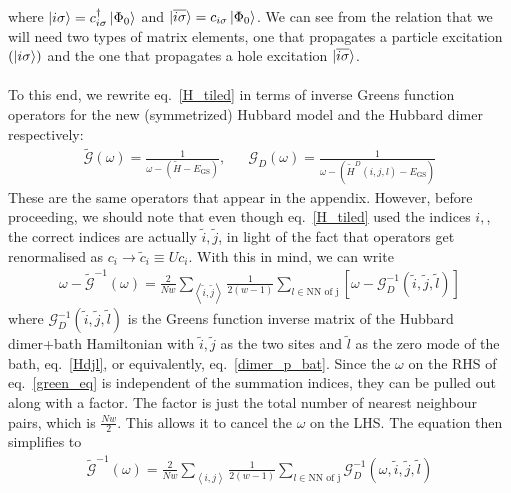 \documentclass{article}
\numberwithin{equation}{section}
\begin{document}
where $\ket{i\sigma}=c^\dagger_{i\sigma}\ket{\Phi_0}$ and $\ket{\overline{i\sigma}}=c_{i\sigma}\ket{\Phi_0}$. We can see from the relation that we will need two types of matrix elements, one that propagates a particle excitation $\left( \ket{i\sigma} \right) $ and the one that propagates a hole excitation $\ket{\overline{i\sigma}}$.
\\\\
To this end, we rewrite eq.~\ref{H_tiled} in terms of inverse Greens function operators for the new (symmetrized) Hubbard model and the Hubbard dimer respectively:
\begin{equation}\begin{aligned}
	\label{Gd_op}
	\mathcal{\tilde G}(\omega) = \frac{1}{\omega - \left(\tilde H - E_\text{GS}\right)}, && \mathcal{G}_D(\omega) = \frac{1}{\omega - \left(\tilde H^D(i,j,l) - E_\text{GS}\right)}
\end{aligned}\end{equation}
These are the same operators that appear in the appendix. However, before proceeding, we should note that even though eq.~\ref{H_tiled} used the indices $i,$, the correct indices are actually $\tilde i, \tilde j$, in light of the fact that operators get renormalised as $c_i \to \tilde c_i\equiv Uc_i$. With this in mind, we can write
\begin{equation}\begin{aligned}
	\label{green_eq}
	\omega - \mathcal{\tilde G}^{-1}(\omega) = \frac{2}{Nw}\sum_{\left<\tilde i, \tilde j\right>} \frac{1}{2(w-1)} \sum_{l \in \text{NN of j}}\left[\omega - \mathcal{G}_D^{-1}\left(\tilde i, \tilde j, \tilde l\right)\right]
\end{aligned}\end{equation}
where $\mathcal{G}_D^{-1}(\tilde i,\tilde j, \tilde l)$ is the Greens function inverse matrix of the Hubbard dimer+bath Hamiltonian with $\tilde i, \tilde j$ as the two sites and \(\tilde l\) as the zero mode of the bath, eq.~\ref{Hdjl}, or equivalently, eq.~\ref{dimer_p_bat}. Since the $\omega$ on the RHS of eq.~\ref{green_eq} is independent of the summation indices, they can be pulled out along with a factor. The factor is just the total number of nearest neighbour pairs, which is $\frac{Nw}{2}$. This allows it to cancel the $\omega$ on the LHS. The equation then simplifies to
\begin{equation}\begin{aligned}
	\mathcal{\tilde G}^{-1}(\omega) = \frac{2}{Nw}\sum_{\left<i,j\right>}\frac{1}{2(w-1)}\sum_{l \in \text{NN of j}}\mathcal{G}_D^{-1}\left(\omega, \tilde i, \tilde j, \tilde l\right)
\end{aligned}\end{equation}
\end{document}
